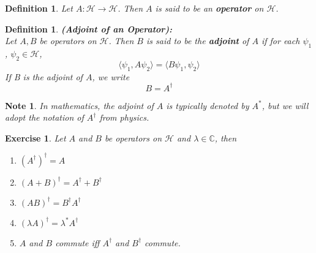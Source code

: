 \documentclass[12pt]{amsart}
\newtheorem{defn}[thm]{Definition}
\newtheorem{note}[thm]{Note}
\newtheorem{ex}[thm]{Exercise}
\renewcommand{\r}{\rangle}
\renewcommand{\l}{\langle}
\newcommand{\lam}{\lambda}
\newcommand{\C}{\mathbb{C}}
\newcommand{\MH}{\mathcal{H}}
\begin{document}
\begin{defn}
	Let $A: \MH \rightarrow \MH$. Then $A$ is said to be an \textbf{operator} on $\MH$.
\end{defn}

\begin{defn}\textbf{(Adjoint of an Operator):} \\
	Let $A,B$ be operators on $\MH$. Then $B$ is said to be the \textbf{adjoint} of $A$ if for each $\psi_1$, $\psi_2 \in \MH$, $$\l \psi_1 , A\psi_2 \r = \l B \psi_1 , \psi_2 \r$$  If B is the adjoint of $A$, we write $$B = A^{\dagger}$$
\end{defn}

\begin{note}
	In mathematics, the adjoint of $A$ is typically denoted by $A^*$, but we will adopt the notation of $A^{\dagger}$ from physics.
\end{note}

\begin{ex}
	Let $A$ and $B$ be operators on $\MH$ and $\lam \in \C$, then \begin{enumerate}
		\item $(A^{\dagger})^{\dagger} = A$
		\item $(A + B)^{\dagger} = A^{\dagger} + B^{\dagger}$
		\item $(AB)^{\dagger} = B^{\dagger}A^{\dagger}$
		\item $(\lam A)^{\dagger} = \lam^*A^{\dagger}$
		\item $A$ and $B$ commute iff $A^{\dagger}$ and $B^{\dagger}$ commute.
	\end{enumerate}
\end{ex}
\end{document}
